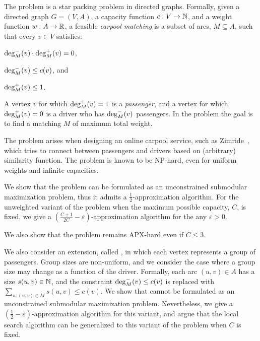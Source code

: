 The \carpool problem is a star packing problem in directed graphs.
Formally, given a directed graph $G = (V, A)$, a capacity function $c:
V \rightarrow \N$, and a weight function $w : A \rightarrow \R $, a
feasible \emph{carpool matching} is a subset of arcs, $M \subseteq A$,
such that every $v \in V$ satisfies:%
\begin{inparaenum}[(i)]
\item $\din[M](v) \cdot \dout[M](v) = 0$,
\item $\din[M](v) \leq c(v)$, and 
\item $\dout[M](v) \leq 1$.
\end{inparaenum}
A vertex $v$ for which $\dout[M](v) = 1$ is a \emph{passenger}, and a
vertex for which $\dout[M](v) = 0$ is a driver who has $\din[M](v)$
passengers.  In the \carpool problem the goal is to find a matching
$M$ of maximum total weight.

The problem arises when designing an online carpool service, such as
Zimride~\cite{zimride}, which tries to connect between passengers and
drivers based on (arbitrary) similarity function.  The problem is
known to be NP-hard, even for uniform weights and infinite capacities.

We show that the problem can be formulated as an unconstrained
submodular maximization problem, thus it admits a
$\frac{1}{2}$-approximation algorithm.  For the unweighted variant of
the problem when the maximum possible capacity, $C$, is fixed, we give
a $(\frac{C + 1}{2C} - \varepsilon)$-approximation algorithm for the
any $\varepsilon > 0$.

We also show that the
problem remains APX-hard even if $C \leq 3$.

We also consider an extension, called \gcp, in which each vertex
represents a group of passengers.  Group sizes are non-uniform, and we
consider the case where a group size may change as a function of the
driver.  Formally, each arc $(u,v) \in A$ has a size $s(u,v) \in \N$,
and the constraint $\din[M](v) \leq c(v)$ is replaced with
$\sum_{u:(u,v) \in M} s(u,v) \leq c(v)$.  We show that \gcp cannot be
formulated as an unconstrained submodular maximization problem.
Nevertheless, we give a $(\frac{1}{2} - \varepsilon)$-approximation
algorithm for this variant, and argue that the local search algorithm
can be generalized to this variant of the problem when $C$ is fixed.
